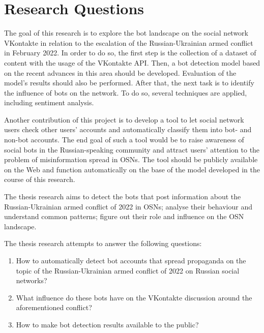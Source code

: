 \section{Research Questions}
\label{sec:reserach_questions}

The goal of this research is to explore the bot landscape on the social network VKontakte in relation to the escalation of the Russian-Ukrainian armed conflict in February 2022. In order to do so, the first step is the collection of a dataset of content with the usage of the VKontakte API. Then, a bot detection model based on the recent advances in this area should be developed. Evaluation of the model's results should also be performed. After that, the next task is to identify the influence of bots on the network. To do so, several techniques are applied, including sentiment analysis.

Another contribution of this project is to develop a tool to let social network users check other users' accounts and automatically classify them into bot- and non-bot accounts. The end goal of such a tool would be to raise awareness of social bots in the Russian-speaking community and attract users' attention to the problem of misinformation spread in OSNs. The tool should be publicly available on the Web and function automatically on the base of the model developed in the course of this research.

The thesis research aims to detect the bots that post information about the Russian-Ukrainian armed conflict of 2022 in OSNs; analyse their behaviour and understand common patterns; figure out their role and influence on the OSN landscape.

The thesis research attempts to answer the following questions:
\begin{enumerate}
    \item How to automatically detect bot accounts that spread propaganda on the topic of the Russian-Ukrainian armed conflict of 2022 on Russian social networks?
    \item What influence do these bots have on the VKontakte discussion around the aforementioned conflict?
    \item How to make bot detection results available to the public? 
\end{enumerate}


